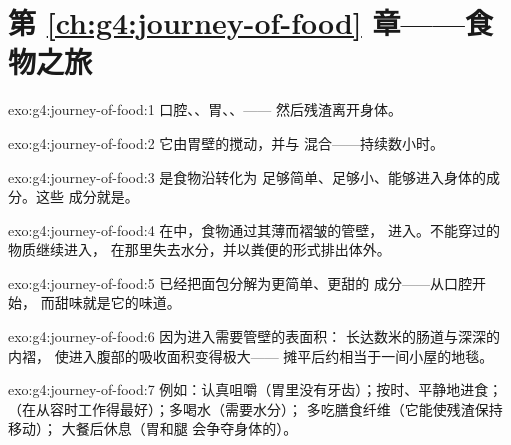 \section*{第 \ref{ch:g4:journey-of-food} 章——食物之旅}

\begin{solution}{exo:g4:journey-of-food:1}
口腔、、胃、、——
然后残渣离开身体。
\end{solution}

\begin{solution}{exo:g4:journey-of-food:2}
它由胃壁的搅动，并与
混合——持续数小时。
\end{solution}

\begin{solution}{exo:g4:journey-of-food:3}
是食物沿转化为
足够简单、足够小、能够进入身体的成分。这些
成分就是。
\end{solution}

\begin{solution}{exo:g4:journey-of-food:4}
在中，食物通过其薄而褶皱的管壁，
进入。不能穿过的物质继续进入，
在那里失去水分，并以粪便的形式排出体外。
\end{solution}

\begin{solution}{exo:g4:journey-of-food:5}
已经把面包分解为更简单、更甜的
成分——从口腔开始，
而甜味就是它的味道。
\end{solution}

\begin{solution}{exo:g4:journey-of-food:6}
因为进入需要管壁的表面积：
长达数米的肠道与深深的内褶，
使进入腹部的吸收面积变得极大——
摊平后约相当于一间小屋的地毯。
\end{solution}

\begin{solution}{exo:g4:journey-of-food:7}
例如：认真咀嚼（胃里没有牙齿）；按时、平静地进食；
（在从容时工作得最好）；多喝水（需要水分）；
多吃膳食纤维（它能使残渣保持移动）；
大餐后休息（胃和腿
会争夺身体的）。
\end{solution}

